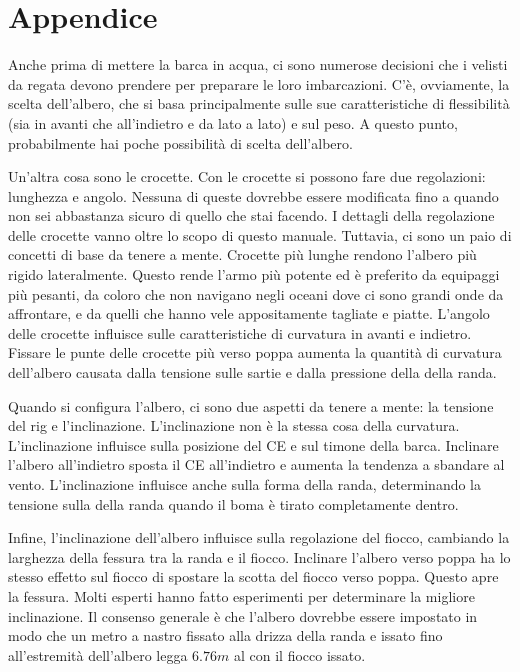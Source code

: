 
\section*{Appendice}
\label{sec:appendice}
Anche prima di mettere la barca in acqua, ci sono numerose decisioni che i
velisti da regata devono prendere per preparare le loro imbarcazioni. C'è,
ovviamente, la scelta dell'albero, che si basa principalmente sulle sue
caratteristiche di flessibilità (sia in avanti che all'indietro e da lato a
lato) e sul peso. A questo punto, probabilmente hai poche possibilità di scelta
dell'albero.

Un'altra cosa sono le crocette. Con le crocette si possono fare due regolazioni:
lunghezza e angolo. Nessuna di queste dovrebbe essere modificata fino a quando
non sei abbastanza sicuro di quello che stai facendo. I dettagli della
regolazione delle crocette vanno oltre lo scopo di questo manuale. Tuttavia, ci
sono un paio di concetti di base da tenere a mente. Crocette più lunghe rendono
l'albero più rigido lateralmente. Questo rende l'armo più potente ed è
preferito da equipaggi più pesanti, da coloro che non navigano negli oceani dove
ci sono grandi onde da affrontare, e da quelli che hanno vele appositamente
tagliate e piatte. L'angolo delle crocette influisce sulle caratteristiche di
curvatura in avanti e indietro. Fissare le punte delle crocette più verso poppa
aumenta la quantità di curvatura dell'albero causata dalla tensione sulle sartie
e dalla pressione della \sheet della randa.

Quando si configura l'albero, ci sono due aspetti da tenere a mente: la tensione
del rig e l'inclinazione. L'inclinazione non è la stessa cosa della curvatura.
L'inclinazione influisce sulla posizione del \ac{CE} e sul timone della
barca. Inclinare l'albero all'indietro sposta il \ac{CE} all'indietro e aumenta la
tendenza a sbandare al vento. L'inclinazione influisce anche sulla forma della
randa, determinando la tensione sulla \sheet della randa quando il boma è tirato
completamente dentro.

Infine, l'inclinazione dell'albero influisce sulla regolazione del fiocco,
cambiando la larghezza della fessura tra la randa e il fiocco. Inclinare
l'albero verso poppa ha lo stesso effetto sul fiocco di spostare la scotta del
fiocco verso poppa. Questo apre la fessura. Molti esperti hanno fatto
esperimenti per determinare la migliore inclinazione. Il consenso generale è che
l'albero dovrebbe essere impostato in modo che un metro a nastro fissato alla
drizza della randa e issato fino all'estremità dell'albero legga $6.76\si{m}$ al
\transom con il fiocco issato.


